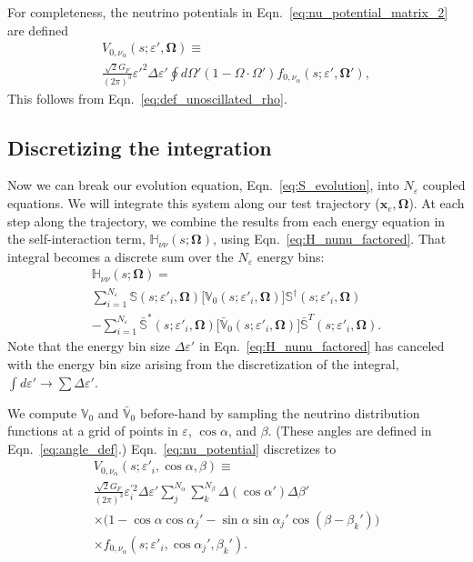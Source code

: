 \documentclass[aps,prd,twocolumn,superscriptaddress,groupedaddress]{revtex4}
\begin{document}
For completeness, the neutrino potentials in
Eqn.~\ref{eq:nu_potential_matrix_2} are defined
\begin{multline}
  \label{eq:nu_potential}
  V_{0,\nu_\alpha}(s;\varepsilon',\bm{\Omega}) \equiv \\
  \frac{\sqrt{2} G_F}{(2\pi)^3}\varepsilon'^2 \Delta\varepsilon'
  \oint d\Omega'
  (1-\Omega\cdot\Omega')
  f_{0,\nu_\alpha}(s;\varepsilon',\bm{\Omega}'),
\end{multline}
This follows from Eqn.~\ref{eq:def_unoscillated_rho}.

\subsection*{Discretizing the integration}
Now we can break our evolution equation, Eqn.~\ref{eq:S_evolution},
into $N_\varepsilon$ coupled equations.
We will integrate this system along our test trajectory
($\bm{x}_e,\bm{\Omega}$).
At each step along the trajectory,
we combine the results from each energy equation in the self-interaction term,
$\mathbb{H}_{\nu\nu}(s;\bm{\Omega})$, using Eqn.~\ref{eq:H_nunu_factored}.
That integral becomes a discrete sum over the $N_\varepsilon$ energy bins:
\begin{multline}
  \label{eq:H_nunu_sum}
  \mathbb{H}_{\nu\nu}(s;\bm{\Omega}) = \\
  \sum\limits_{i=1}^{N_\varepsilon}
  \mathbb{S}(s;\varepsilon'_i,\bm{\Omega})
  \big[
    \mathbb{V}_0(s;\varepsilon'_i,\bm{\Omega})
    \big]
  \mathbb{S}^\dagger(s;\varepsilon'_i,\bm{\Omega}) \\
  - \sum\limits_{i=1}^{N_\varepsilon}
  \bar{\mathbb{S}}^*(s;\varepsilon'_i,\bm{\Omega})
  \big[
    \bar{\mathbb{V}}_0(s;\varepsilon'_i,\bm{\Omega})
    \big]
  \bar{\mathbb{S}}^T(s;\varepsilon'_i,\bm{\Omega}).
\end{multline}
Note that the energy bin size $\Delta\varepsilon'$ in
Eqn.~\ref{eq:H_nunu_factored} has canceled with the energy bin size arising from
the discretization of the integral,
$\int d\varepsilon' \rightarrow \sum \Delta\varepsilon'$.

We compute $\mathbb{V}_0$ and $\bar{\mathbb{V}}_0$ before-hand by sampling
the neutrino distribution functions at a grid of points in $\varepsilon$,
$\cos\alpha$, and $\beta$.
(These angles are defined in Eqn.~\ref{eq:angle_def}.)
Eqn.~\ref{eq:nu_potential} discretizes to
\begin{multline}
  \label{eq:nu_potential_sum}
  V_{0,\nu_\alpha}(s;\varepsilon'_i,\cos\alpha,\beta) \equiv \\
  \frac{\sqrt{2} G_F}{(2\pi)^3}\varepsilon_i^{'2} \Delta\varepsilon'
  \sum\limits_j^{N_\alpha} \sum\limits_k^{N_\beta}
  \Delta(\cos\alpha') \Delta\beta'\\
  \times \big(1-\cos\alpha\cos\alpha_j'-\sin\alpha\sin\alpha_j'\cos(\beta-\beta_k')\big)\\
  \times f_{0,\nu_\alpha}(s;\varepsilon'_i,\cos\alpha_j',\beta_k').
\end{multline}
\end{document}
